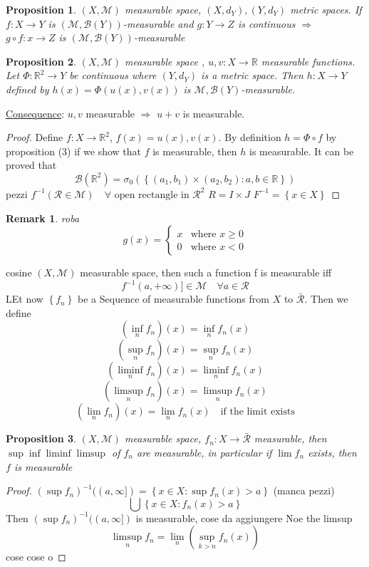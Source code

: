 \documentclass[a4paper,12pt]{article}
\theoremstyle{break}
\newtheorem{proposition}{Proposition}[section]
\newtheorem{remark}[section]{Remark}
\newcommand{\real}{\mathbb{R}}
\numberwithin{equation}{section}
\begin{document}
\begin{proposition}
    \((X, \mathcal{M})\) measurable space, \((X, d_Y), (Y, d_Y)\) metric spaces. 
    If \(f: X \to Y\) is \((\mathcal{M}, \mathcal{B}(Y))\)-measurable and \(g : Y \to Z\) is continuous \(\Longrightarrow\) \(g \circ f : x \to Z\) is \((\mathcal{M}, \mathcal{B}(Y))\)-measurable
\end{proposition}
\begin{proposition}
    \((X, \mathcal{M})\) measurable space , \(u,v : X \to  \real\) measurable functions.
    Let \(\Phi : \mathbb{R}^2 \to Y\) be continuous where \((Y, d_Y)\) is a metric space. Then \(h: X\to Y\) defined by \(h(x) = \Phi(u(x), v(x))\) is \(\mathcal{M}, \mathcal{B}(Y)\)-measurable.
\end{proposition}
\underline{Consequence}: \(u, v\) measurable \(\Rightarrow\) \(u+v\) is measurable.
\begin{proof}
    Define \(f: X \to \mathbb{R}^2\), \(f(x) = u(x), v(x)\). By definition \(h = \Phi \circ f\) by proposition (3) if we show that \(f\) is measurable, then \(h\) is measurable. It can be proved that \[\mathcal{B}(\mathbb{R}^2) = \sigma_0 \left(\left\lbrace (a_1, b_1) \times (a_2, b_2): a,b \in \mathbb{R}\right\rbrace\right)\]
    pezzi
    \(f^{-1}(\mathcal{R} \in \mathcal{M}) \quad \forall \mbox{ open rectangle in }\mathcal{R}^2\)
    \(R = I \times J\)
    \(F^{-1} = \left\lbrace x \in X \right\rbrace\) 
\end{proof}
\begin{remark}
    roba 
    \[
        g(x) = \begin{cases}
            x & \mbox{where } x \geq 0 \\
            0 & \mbox{where } x < 0
        \end{cases}
    \]
\end{remark}
cosine 
\((X,\mathcal{M})\) measurable space, then such a  function f is measurable iff
\[
    f^{-1}(a, +\infty)] \in \mathcal{M} \quad \forall a \in \mathcal{R}
\]
LEt now \(\left\lbrace f_n \right\rbrace\) be a Sequence of measurable functions from \(X\) to \(\bar{\mathcal{R}}\). Then we define \[
    (\inf_n f_n)(x) = \inf_n f_n(x)
\]
\[
    (\sup_n f_n)(x) = \sup_n f_n(x)
\]
\[
    (\liminf_n f_n)(x) = \liminf_n f_n(x)
\]
\[
    (\limsup_n f_n)(x) = \limsup_n f_n(x)
\]
\[
    (\lim_n f_n)(x) = \lim_n f_n(x) \quad \mbox{if the limit exists}
\]
\begin{proposition}
    \((X, \mathcal{M})\) measurable space, \(f_n : X \to \bar{\mathcal{R}}\) measurable, then 
    \(\sup \inf \liminf \limsup\) of \(f_n\) are measurable, in particular if \(\lim f_n\) exists, then \(f\) is measurable
\end{proposition}
\begin{proof}
    \((\sup f_n)^{-1} ((a, \infty]) = \left\lbrace x \in X : \sup f_n(x) > a \right\rbrace\) (manca pezzi)
    \[
        \bigcup \left\lbrace x \in X : f_n(x) > a \right\rbrace
    \]
    Then \((\sup f_n)^{-1} ((a, \infty])\) is measurable, cose da aggiungere
Noe the limsup
\[\limsup_n f_n = \lim_n (\sup_{k > n} f_n(x))\]
cose cose o
\end{proof}
\end{document}
